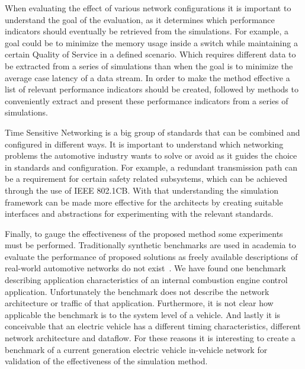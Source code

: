

When evaluating the effect of various network configurations it is important to understand the goal of the evaluation, as it determines which performance indicators should eventually be retrieved from the simulations. For example, a goal could be to minimize the memory usage inside a switch while maintaining a certain Quality of Service in a defined scenario. Which requires different data to be extracted from a series of simulations than when the goal is to minimize the average case latency of a data stream. In order to make the method effective a list of relevant performance indicators should be created, followed by methods to conveniently extract and present these performance indicators from a series of simulations.

Time Sensitive Networking is a big group of standards that can be combined and configured in different ways. It is important to understand which networking problems the automotive industry wants to solve or avoid as it guides the choice in standards and configuration. For example, a redundant transmission path can be a requirement for certain safety related subsystems, which can be achieved through the use of IEEE 802.1CB. With that understanding the simulation framework can be made more effective for the architects by creating suitable interfaces and abstractions for experimenting with the relevant standards.

Finally, to gauge the effectiveness of the proposed method some experiments must be performed. Traditionally synthetic benchmarks are used in academia to evaluate the performance of proposed solutions as freely available descriptions of real-world automotive networks do not exist~\cite{ashjaei2021time}. We have found one benchmark~\cite{kramer2015real} describing application characteristics of an internal combustion engine control application. Unfortunately the benchmark does not describe the network architecture or traffic of that application. Furthermore, it is not clear how applicable the benchmark is to the system level of a vehicle. And lastly it is conceivable that an electric vehicle has a different timing characteristics, different network architecture and dataflow. For these reasons it is interesting to create a benchmark of a current generation electric vehicle in-vehicle network for validation of the effectiveness of the simulation method.

